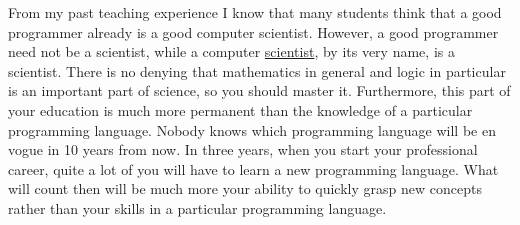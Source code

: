 
From my past teaching experience I know that many students think that a good programmer already is a
good computer scientist.  However, a good programmer need not be a scientist, while a 
{\color{blue}computer \underline{scientist}}, by its very name, is a
{\color{blue}scientist}.  There is no denying that {\color{blue}mathematics} in general and 
{\color{blue}logic} in particular is an important part of science, so you should master it.  Furthermore, this
part of your education is much more permanent than the knowledge of a particular programming
language.  Nobody knows which programming language will be en vogue in 10 years from now.  In three
years, when you start your professional career, quite a lot of you will have to learn a new
programming language.  What will count then will be much more your ability to quickly grasp new
concepts rather than your skills in a particular programming language.

